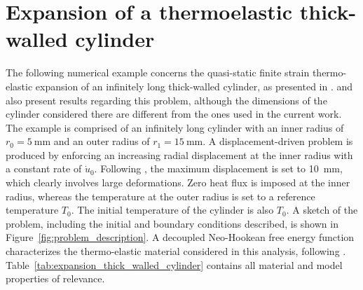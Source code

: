 %

\section{Expansion of a thermoelastic thick-walled cylinder}

The following numerical example concerns the quasi-static finite strain thermo-elastic expansion of an infinitely long thick-walled cylinder, as presented in \cite{ibrahimbegovic_thermodynamics_2009}.
\cite{armero_new_1992} and \cite{erbts_accelerated_2012} also present results regarding this problem, although the dimensions of the cylinder considered there are different from the ones used in the current work.
The example is comprised of an infinitely long cylinder with an inner radius of \(r_{0}=\SI{5}{\milli\meter}\) and an outer radius of \(r_{1}=\SI{15}{\milli\meter}\).
A displacement-driven problem is produced by enforcing an increasing radial displacement at the inner radius with a constant rate of \(\dot{u}_{0}\).
Following \cite{ibrahimbegovic_thermodynamics_2009}, the maximum displacement is set to \SI{10}{\milli\meter}, which clearly involves large deformations.
Zero heat flux is imposed at the inner radius, whereas the temperature at the outer radius is set to a reference temperature \(T_{0}\).
The initial temperature of the cylinder is also \(T_0\).
A sketch of the problem, including the initial and boundary conditions described, is shown in Figure~\ref{fig:problem_description}.
A decoupled Neo-Hookean free energy function characterizes the thermo-elastic material considered in this analysis, following \cite{armero_new_1992}.
Table~\ref{tab:expansion_thick_walled_cylinder} contains all material and model properties of relevance.

